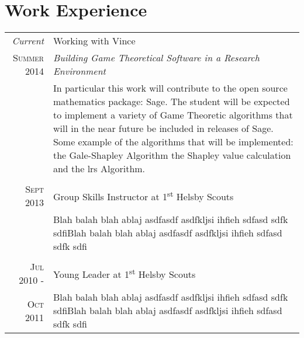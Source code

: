 \documentclass[a4paper, 11pt]{article}
\begin{document}
\section{Work Experience}
\begin{tabular}{rp{12cm}}

\emph{Current} & Working with Vince \\
\textsc{Summer 2014} & \emph{Building Game Theoretical Software in a Research Environment}\\
& \footnotesize{In particular this work will contribute to the open source mathematics package: Sage. The student will be expected to implement a variety of Game Theoretic algorithms that will in the near future be included in releases of Sage. Some example of the algorithms that will be implemented: the Gale-Shapley Algorithm the Shapley value calculation and the lrs Algorithm.}\\
\\
\textsc{Sept 2013} & Group Skills Instructor at 1\textsuperscript{st} Helsby Scouts\\
& \footnotesize{Blah balah blah ablaj asdfasdf asdfkljsi ihfieh sdfasd sdfk sdfiBlah balah blah ablaj asdfasdf asdfkljsi ihfieh sdfasd sdfk sdfi}\\
\\
\textsc{Jul 2010 -} & Young Leader at 1\textsuperscript{st} Helsby Scouts\\
\textsc{Oct 2011}& \footnotesize{Blah balah blah ablaj asdfasdf asdfkljsi ihfieh sdfasd sdfk sdfiBlah balah blah ablaj asdfasdf asdfkljsi ihfieh sdfasd sdfk sdfi}\\

\end{tabular}
\end{document}
